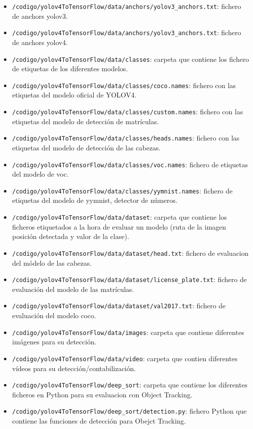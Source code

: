 \begin{itemize}
    \item \texttt{/codigo/yolov4ToTensorFlow/data/anchors/yolov3\_anchors.txt}: fichero de anchors yolov3.
    \item \texttt{/codigo/yolov4ToTensorFlow/data/anchors/yolov3\_anchors.txt}: fichero de anchors yolov4.
    \item \texttt{/codigo/yolov4ToTensorFlow/data/classes}: carpeta que contiene los fichero de etiquetas de los diferentes modelos.
    \item \texttt{/codigo/yolov4ToTensorFlow/data/classes/coco.names}: fichero con las etiquetas del modelo oficial de YOLOV4.
    \item \texttt{/codigo/yolov4ToTensorFlow/data/classes/custom.names}: fichero con las etiquetas del modelo de detección de matrículas.
    \item \texttt{/codigo/yolov4ToTensorFlow/data/classes/heads.names}: fichero con las etiquetas del modelo de detección de las cabezas.
    \item \texttt{/codigo/yolov4ToTensorFlow/data/classes/voc.names}: fichero de etiquetas del modelo de voc.
    \item \texttt{/codigo/yolov4ToTensorFlow/data/classes/yymnist.names}: fichero de etiquetas del modelo de yymnist, detector de números.
    \item \texttt{/codigo/yolov4ToTensorFlow/data/dataset}: carpeta que contiene los ficheros etiquetados a la hora de evaluar un modelo (ruta de la imagen posición detectada y valor de la clase).
    \item \texttt{/codigo/yolov4ToTensorFlow/data/dataset/head.txt}: fichero de evaluacion del módelo de las cabezas. 
    \item \texttt{/codigo/yolov4ToTensorFlow/data/dataset/license\_plate.txt}: fichero de evaluación del modelo de las matrículas.
    \item \texttt{/codigo/yolov4ToTensorFlow/data/dataset/val2017.txt}: fichero de evaluación del modelo coco.
    \item \texttt{/codigo/yolov4ToTensorFlow/data/images}: carpeta que contiene diferentes imágenes para su detección.
    \item \texttt{/codigo/yolov4ToTensorFlow/data/video}: carpeta que contien diferentes vídeos para su detección/contabilización.
    \item \texttt{/codigo/yolov4ToTensorFlow/deep\_sort}: carpeta que contiene los diferentes ficheros en Python para su evaluacion con Object Tracking.
    \item \texttt{/codigo/yolov4ToTensorFlow/deep\_sort/detection.py}: fichero Python que contiene las funciones de detección para Obejct Tracking.

\end{itemize}
